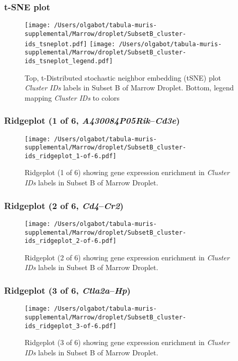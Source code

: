 \clearpage
\subsubsection{t-SNE plot}
\begin{figure}[h]
\centering
\texttt{[image: /Users/olgabot/tabula-muris-supplemental/Marrow/droplet/SubsetB\_cluster-ids\_tsneplot.pdf]}
\texttt{[image: /Users/olgabot/tabula-muris-supplemental/Marrow/droplet/SubsetB\_cluster-ids\_tsneplot\_legend.pdf]}
\caption{Top, t-Distributed stochastic neighbor embedding (tSNE) plot  \emph{Cluster IDs} labels in Subset B of Marrow Droplet. Bottom, legend mapping \emph{Cluster IDs} to colors}
\end{figure}


\clearpage

\subsubsection{Ridgeplot (1 of 6, \emph{A430084P05Rik}--\emph{Cd3e})}
\begin{figure}[h]
\centering
\texttt{[image: /Users/olgabot/tabula-muris-supplemental/Marrow/droplet/SubsetB\_cluster-ids\_ridgeplot\_1-of-6.pdf]}

\caption{ Ridgeplot (1 of 6)  showing gene expression enrichment in \emph{Cluster IDs} labels in Subset B of Marrow Droplet. }
\end{figure}


\clearpage

\subsubsection{Ridgeplot (2 of 6, \emph{Cd4}--\emph{Cr2})}
\begin{figure}[h]
\centering
\texttt{[image: /Users/olgabot/tabula-muris-supplemental/Marrow/droplet/SubsetB\_cluster-ids\_ridgeplot\_2-of-6.pdf]}

\caption{ Ridgeplot (2 of 6)  showing gene expression enrichment in \emph{Cluster IDs} labels in Subset B of Marrow Droplet. }
\end{figure}


\clearpage

\subsubsection{Ridgeplot (3 of 6, \emph{Ctla2a}--\emph{Hp})}
\begin{figure}[h]
\centering
\texttt{[image: /Users/olgabot/tabula-muris-supplemental/Marrow/droplet/SubsetB\_cluster-ids\_ridgeplot\_3-of-6.pdf]}

\caption{ Ridgeplot (3 of 6)  showing gene expression enrichment in \emph{Cluster IDs} labels in Subset B of Marrow Droplet. }
\end{figure}


